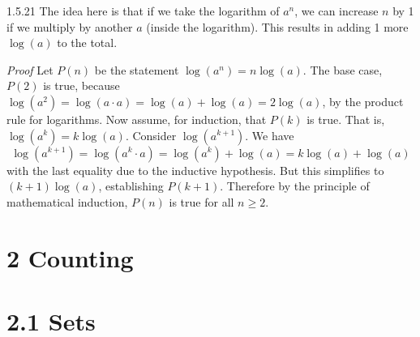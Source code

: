 \documentclass[11pt,]{book}
\makeatletter
\theoremstyle{ptxplainnotitle}
\theoremstyle{ptxplaintitle}
\renewcommand*{\proofname}{Proof}
\renewenvironment{proof}[1][\proofname]{\par
  \pushQED{\qed}%
  \normalfont \topsep6\p@\@plus6\p@\relax
  \trivlist
  \item\relax
    {\itshape
    #1\@addpunct{.}}\hspace\labelsep\ignorespaces
}{%
  \popQED\endtrivlist\@endpefalse
}
\theoremstyle{ptxdefinitionnotitle}
\theoremstyle{ptxdefinitiontitle}
\theoremstyle{ptxdefinitionnotitle}
\theoremstyle{ptxdefinitiontitle}
\theoremstyle{ptxdefinitionnotitle}
\theoremstyle{ptxdefinitiontitle}
\theoremstyle{ptxdefinitiontitlenonumber}
\theoremstyle{ptxdefinitiontitlenonumber}
\numberwithin{equation}{chapter}
\makeatother
\begin{document}
\begin{divisionexercise}{1.5.21}
\textbf{}\hypertarget{p-652}{}%
The idea here is that if we take the logarithm of \(a^n\), we can increase \(n\) by 1 if we multiply by another \(a\) (inside the logarithm). This results in adding 1 more \(\log(a)\) to the total.%
\begin{proof}\hypertarget{proof-19}{}
\hypertarget{p-653}{}%
Let \(P(n)\) be the statement \(\log(a^n) = n \log(a)\). The base case, \(P(2)\) is true, because \(\log(a^2) = \log(a\cdot a) = \log(a) + \log(a) = 2\log(a)\), by the product rule for logarithms. Now assume, for induction, that \(P(k)\) is true. That is, \(\log(a^k) = k\log(a)\). Consider \(\log(a^{k+1})\). We have%
\begin{equation*}
\log(a^{k+1}) = \log(a^k\cdot a) = \log(a^k) + \log(a) = k\log(a) + \log(a)
\end{equation*}
with the last equality due to the inductive hypothesis. But this simplifies to \((k+1) \log(a)\), establishing \(P(k+1)\). Therefore by the principle of mathematical induction, \(P(n)\) is true for all \(n \ge 2\).%
\end{proof}
\end{divisionexercise}%
\section*{2 Counting}
\section*{2.1 Sets}
\end{document}

